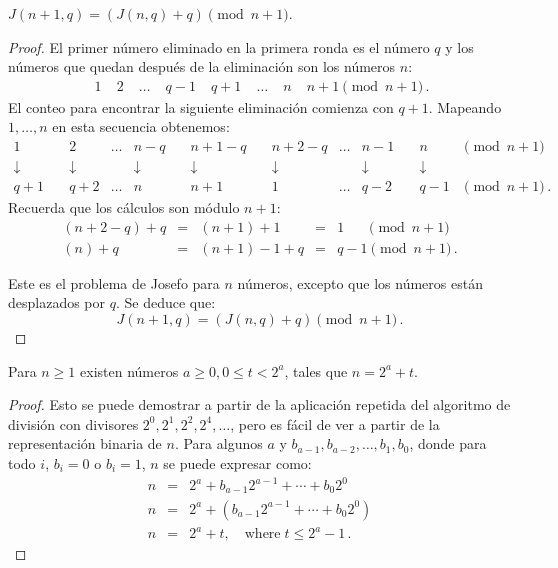 \begin{theorem}\label{thm.jo1}
$J(n+1,q)=(J(n,q)+q) \pmod {n+1}$.
\end{theorem}

\begin{proof}
El primer número eliminado en la primera ronda es el número $q$ y los números que quedan después de la eliminación son los números $n$:
\[
\begin{array}{rrrrrrrr}
\;1&\;2&\;\ldots&\;q-1&\;q+1&\;\ldots&\;n&\;n+1 \pmod {n+1}\,.
\end{array}
\]
El conteo para encontrar la siguiente eliminación comienza con $q+1$. Mapeando $1,\ldots,n$ en esta secuencia obtenemos:
\[
\begin{array}{cccccccccc}
1&\quad 2&\ldots& n-q&\quad n+1-q&\quad n+2-q&\ldots&n-1&\quad n& \!\!\!\!\!\!\pmod {n\!+\!1}\\
\downarrow&\quad \downarrow&&\downarrow&\quad \downarrow&\quad \downarrow&&\downarrow&\quad \downarrow\\
q+1&\quad q+2&\ldots&n&\quad n+1&\quad 1&\ldots&q-2&\quad q-1& \!\!\!\pmod {n\!+\!1}\,.
\end{array}
\]
Recuerda que los cálculos son módulo $n+1$:
\[
\begin{array}{lclcl}
(n+2-q)+q&=& (n+1)+1&=& 1 \quad\;\;\pmod {n+1}\\
(n)+q&= &(n+1)-1+q&= &q-1\pmod {n+1}\,.
\end{array}
\]

Este es el problema de Josefo para $n$ números, excepto que los números están desplazados por $q$. Se deduce que:
\[
J(n+1,q)=(J(n,q)+q) \pmod {n+1}\,.
\]
\end{proof}

\begin{theorem}\label{lem.jo}
Para $n\geq 1$ existen números $a\geq 0, 0\leq t < 2^a$, tales que $n=2^a+t$.
\end{theorem}
\begin{proof}
Esto se puede demostrar a partir de la aplicación repetida del algoritmo de división con divisores $2^0, 2^1, 2^2, 2^4,\ldots$, pero es fácil de ver a partir de la representación binaria de $n$. Para algunos $a$ y $b_{a-1},b_{a-2},\ldots,b_{1},b_{0}$, donde para todo $i$, $b_i=0$ o $b_i=1$, $n$ se puede expresar como:
\begin{eqnarray*}
n&=&2^a+b_{a-1}2^{a-1}+\cdots+b_{0}2^{0}\\
n&=&2^a+(b_{a-1}2^{a-1}+\cdots+b_{0}2^{0})\\
n&=&2^a+t,\quad \textrm{where}\; t\leq 2^a-1\,.
\end{eqnarray*}
\end{proof}

